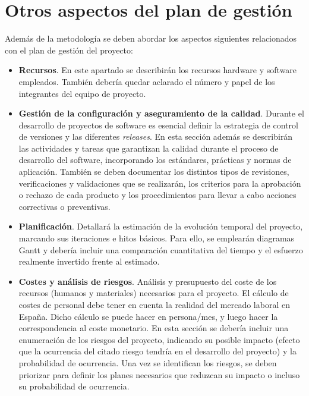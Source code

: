 \section{Otros aspectos del plan de gestión}
Además de la metodología se deben abordar los aspectos siguientes relacionados con el plan de gestión del proyecto:
\begin{itemize}
\item \textbf{Recursos}. En este apartado se describirán los recursos hardware y software empleados. También debería quedar aclarado el número y papel de los integrantes del equipo de proyecto.

\item \textbf{Gestión de la configuración y aseguramiento de la calidad}. Durante el desarrollo de proyectos de software es esencial definir la estrategia de control de versiones y las diferentes \emph{releases}. En esta sección además se describirán las actividades y tareas que garantizan la calidad durante el proceso de desarrollo del software, incorporando los estándares, prácticas y normas de aplicación. También se deben documentar los distintos tipos de revisiones, verificaciones y validaciones que se realizarán, los criterios para la aprobación o rechazo de cada producto y los procedimientos para llevar a cabo acciones correctivas o preventivas.

\item \textbf{Planificación}. Detallará la estimación de la evolución temporal del proyecto, marcando sus iteraciones e hitos básicos. Para ello, se emplearán diagramas Gantt y debería incluir una comparación cuantitativa del tiempo y el esfuerzo realmente invertido frente al estimado.

\item \textbf{Costes y análisis de riesgos}. Análisis y presupuesto del coste de los recursos (humanos y materiales) necesarios para el proyecto. El cálculo de costes de personal debe tener en cuenta la realidad del mercado laboral en España. Dicho cálculo se puede hacer en persona/mes, y luego hacer la correspondencia al coste monetario. En esta sección se debería incluir una enumeración de los riesgos del proyecto, indicando su posible impacto (efecto que la ocurrencia del citado riesgo tendría en el desarrollo del proyecto) y la probabilidad de ocurrencia. Una vez se identifican los riesgos, se deben priorizar para definir los planes necesarios que reduzcan su impacto o incluso su probabilidad de ocurrencia.
\end{itemize}



